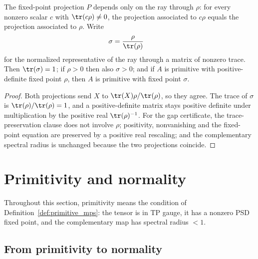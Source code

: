\begin{lemma}
    \label{thm:primitive_fixed_point_trace_normalization}
    \leanok
    The fixed-point projection $P$ depends only on the ray through $\rho$: for
    every nonzero scalar $c$ with $\tr(c\rho)\neq0$, the projection associated
    to $c\rho$ equals the projection associated to $\rho$.  Write
    \begin{align}
        \sigma & =\frac{\rho}{\tr(\rho)}
        \label{eq:primitive_fixed_point_normalized}
    \end{align}
    for the normalized representative of the ray through a matrix of nonzero
    trace.  Then $\tr(\sigma)=1$; if $\rho>0$ then also $\sigma>0$; and if $A$
    is primitive with positive-definite fixed point $\rho$, then $A$ is
    primitive with fixed point $\sigma$.
\end{lemma}

\begin{proof}
    \leanok
    Both projections send $X$ to $\tr(X)\rho/\tr(\rho)$, so they agree.  The
    trace of $\sigma$ is $\tr(\rho)/\tr(\rho)=1$, and a positive-definite
    matrix stays positive definite under multiplication by the positive real
    $\tr(\rho)^{-1}$.  For the gap certificate, the trace-preservation clause
    does not involve $\rho$; positivity, nonvanishing and the fixed-point
    equation are preserved by a positive real rescaling; and the complementary
    spectral radius is unchanged because the two projections coincide.
\end{proof}

\section{Primitivity and normality}

Throughout this section, primitivity means the condition of
Definition~\ref{def:primitive_mps}: the tensor is in TP gauge,
it has a nonzero PSD fixed point, and the complementary map has
spectral radius $<1$.

\subsection{From primitivity to normality}\label{subsec:prim_to_normal}

